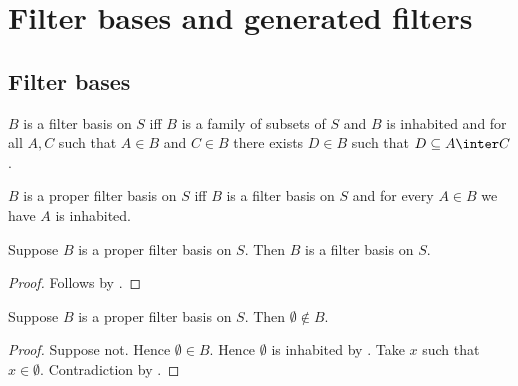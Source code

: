 \section{Filter bases and generated filters}



\subsection{Filter bases}

\begin{definition}\label{filter_basis}
    $B$ is a filter basis on $S$ iff
        $B$ is a family of subsets of $S$ and
        $B$ is inhabited and
        for all $A,C$ such that $A\in B$ and $C\in B$
            there exists $D\in B$ such that $D\subseteq A\inter C$.
\end{definition}

\begin{definition}\label{proper_filter_basis}
    $B$ is a proper filter basis on $S$ iff
        $B$ is a filter basis on $S$ and
        for every $A\in B$ we have $A$ is inhabited.
\end{definition}

\begin{classification}\label{proper_filter_basis_is_filter_basis}
    Suppose $B$ is a proper filter basis on $S$.
    Then $B$ is a filter basis on $S$.
\end{classification}
\begin{proof}
    Follows by .
\end{proof}

\begin{proposition}\label{proper_filter_basis_excludes_emptyset}
    Suppose $B$ is a proper filter basis on $S$.
    Then $\emptyset\notin B$.
\end{proposition}
\begin{proof}
    Suppose not.
    Hence $\emptyset\in B$.
    Hence $\emptyset$ is inhabited by .
    Take $x$ such that $x\in\emptyset$.
    Contradiction by .
\end{proof}

